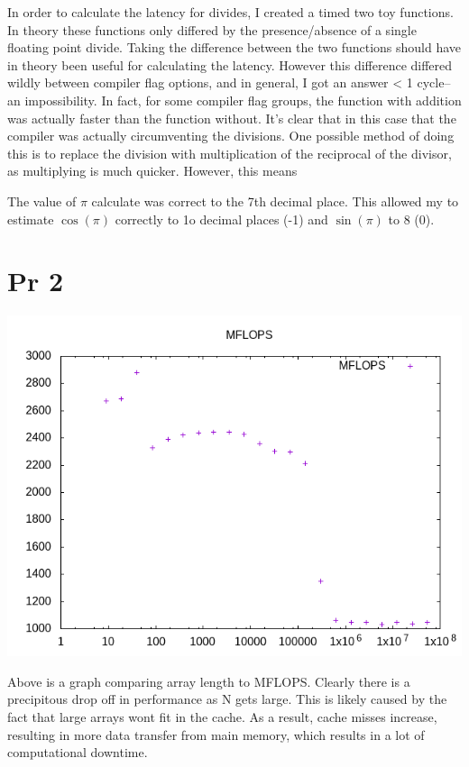 \documentclass[11pt]{article}
\begin{document}
In order to calculate the latency for divides, I created a timed two toy functions. In theory these functions only differed by the presence/absence of a single floating point divide. Taking the difference between the two functions should have in theory been useful for calculating the latency. However this difference differed wildly between compiler flag options, and in general, I got an answer < 1 cycle--an impossibility. In fact, for some compiler flag groups, the function with addition was actually faster than the function without. It's clear that in this case that the compiler was actually circumventing the divisions. One possible method of doing this is to replace the division with multiplication of the reciprocal of the divisor, as multiplying is much quicker. However, this means  

The value of \(\pi\) calculate was correct to the 7th decimal place. This allowed my to estimate \(\cos(\pi)\) correctly to 1o decimal places (-1) and \(\sin(\pi)\) to 8 (0).

\section{Pr 2}
\label{sec:org9faa643}

\begin{center}
\includegraphics[width=.9\linewidth]{MFLOPS.png}
\end{center}

Above is a graph comparing array length to MFLOPS. Clearly there is a precipitous drop off in performance as N gets large. This is likely caused by the fact that large arrays wont fit in the cache. As a result, cache misses increase, resulting in more data transfer from main memory, which results in a lot of computational downtime.
\end{document}
